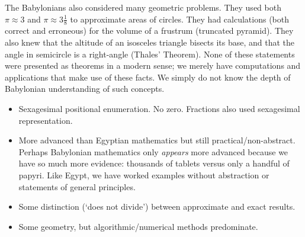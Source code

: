 The Babylonians also considered many geometric problems. They used both $\pi\approx 3$ and $\pi\approx 3\frac 18$ to approximate areas of circles. They had calculations (both correct and erroneous) for the volume of a frustrum (truncated pyramid). They also knew that the altitude of an isosceles triangle bisects its base, and that the angle in semicircle is a right-angle (Thales' Theorem). None of these statements were presented as theorems in a modern sense; we merely have computations and applications that make use of these facts. We simply do not know the depth of Babylonian understanding of such concepts.



\begin{itemize}
  \item Sexagesimal positional enumeration. No zero. Fractions also used sexagesimal representation.
  \item More advanced than Egyptian mathematics but still practical/non-abstract. Perhaps Babylonian mathematics only \emph{appears} more advanced because we have so much more evidence: thousands of tablets versus only a handful of papyri. Like Egypt, we have worked examples without abstraction or statements of general principles.
  \item Some distinction (`does not divide') between approximate and exact results.
  \item Some geometry, but algorithmic/numerical methods predominate.
\end{itemize}



